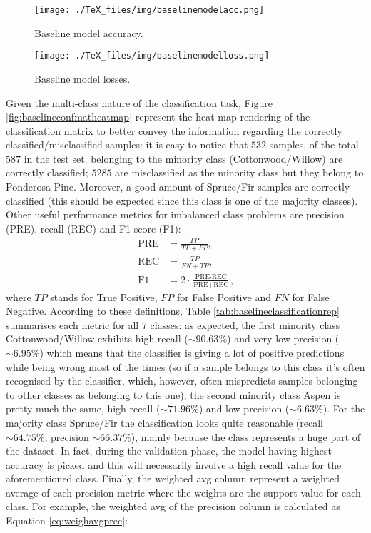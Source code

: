 \begin{figure}
\centering
\texttt{[image: ./TeX\_files/img/baselinemodelacc.png]}
\caption{Baseline model accuracy.}
\label{fig:baselinemodelacc}
\end{figure}
\begin{figure}
\centering
\texttt{[image: ./TeX\_files/img/baselinemodelloss.png]}
\caption{Baseline model losses.}
\label{fig:baselinemodelloss}
\end{figure}
Given the multi-class nature of the classification task, Figure \ref{fig:baselineconfmatheatmap} represent the heat-map rendering of the classification matrix to better convey the information regarding the correctly classified/misclassified samples: it is easy to notice that $532$ samples, of the total $587$ in the test set, belonging to the minority class (Cottonwood/Willow) are correctly classified; $5285$ are misclassified as the minority class but they belong to Ponderosa Pine. Moreover, a good amount of Spruce/Fir samples are correctly classified (this should be expected since this class is one of the majority classes). Other useful performance metrics for imbalanced class problems are precision (PRE), recall (REC) and F1-score (F1):
\begin{equation}
\begin{aligned}
\text{PRE} &= \frac{TP}{TP+FP}\text{,} \\
\text{REC} &= \frac{TP}{FN+TP}\text{,} \\
\text{F1} &= 2 \cdot \frac{\text{PRE} \cdot \text{REC}}{\text{PRE} + \text{REC}}\text{,}
\end{aligned}
\end{equation}
where $TP$ stands for True Positive, $FP$ for False Positive and $FN$ for False Negative. According to these definitions, Table \ref{tab:baselineclassificationrep} summarises each metric for all $7$ classes: as expected, the first minority class Cottonwood/Willow exhibits high recall ($\sim90.63\%$) and very low precision ($\sim6.95\%$) which means that the classifier is giving a lot of positive predictions while being wrong most of the times (so if a sample belongs to this class it's often recognised by the classifier, which, however, often mispredicts samples belonging to other classes as belonging to this one); the second minority class Aspen is pretty much the same, high recall ($\sim71.96\%$) and low precision ($\sim6.63\%$). For the majority class Spruce/Fir the classification looks quite reasonable (recall $\sim64.75\%$, precision $\sim66.37\%$), mainly because the class represents a huge part of the dataset. In fact, during the validation phase, the model having highest accuracy is picked and this will necessarily involve a high recall value for the aforementioned class. Finally, the weighted avg column represent a weighted average of each precision metric where the weights are the support value for each class. For example, the weighted avg of the precision column is calculated as Equation \ref{eq:weighavgprec}:
